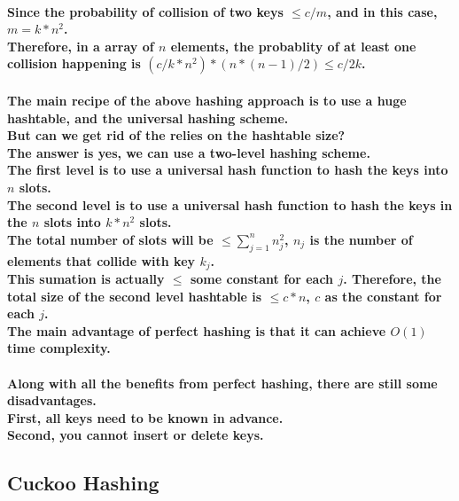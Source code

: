 \documentclass{article}
\begin{document}
\paragraph{Since the probability of collision of two keys $\leq c/m$, and in this case, $m=k*n^2$.\\
Therefore, in a array of $n$ elements, the probablity of at least one collision happening is 
$(c/k*n^2) * (n*(n-1)/2) \leq c/2k$.\\}

\paragraph{The main recipe of the above hashing approach is to use a huge hashtable, and the universal hashing scheme.\\
But can we get rid of the relies on the hashtable size?\\
The answer is yes, we can use a two-level hashing scheme.\\
The first level is to use a universal hash function to hash the keys into $n$ slots.\\
The second level is to use a universal hash function to hash the keys in the $n$ slots into $k*n^2$ slots.\\
The total number of slots will be $\leq \sum_{j=1}^n n_j^2$, $n_j$ is the number of elements that collide with key $k_j$.\\
This sumation is actually $\leq$ some constant for each $j$. Therefore, the total size of the second level hashtable is 
$\leq c*n$, $c$ as the constant for each $j$.\\
The main advantage of perfect hashing is that it can achieve $O(1)$ time complexity.\\}

\paragraph{Along with all the benefits from perfect hashing, there are still some disadvantages.\\
First, all keys need to be known in advance.\\
Second, you cannot insert or delete keys.\\}


\subsection{Cuckoo Hashing}
\end{document}
